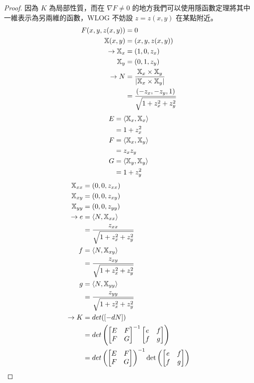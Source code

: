 \documentclass[10pt,a4paper]{article}
\begin{document}
\begin{proof}
因為 $K$ 為局部性質，而在 $\nabla F\neq 0$ 的地方我們可以使用隱函數定理將其中一維表示為另兩維的函數，WLOG 不妨設 $z=z(x,y)$ 在某點附近。
\begin{align*}
F(x,y,z(x,y))&=0\\
\mathbb{X}(x,y)&=(x,y,z(x,y))\\
\rightarrow \mathbb{X}_x&=(1,0,z_x)\\
\mathbb{X}_y&=(0,1,z_y)\\
\rightarrow N&=\frac{\mathbb{X}_x\times\mathbb{X}_y}{|\mathbb{X}_x\times\mathbb{X}_y|}\\
&=\frac{(-z_x,-z_y,1)}{\sqrt{1+z_x^2+z_y^2}}\\
\end{align*}
\begin{align*}
E&=\langle\mathbb{X}_x, \mathbb{X}_x\rangle\\
&=1+z_x^2\\
F&=\langle\mathbb{X}_x, \mathbb{X}_y\rangle\\
&=z_xz_y\\
G&=\langle\mathbb{X}_y, \mathbb{X}_y\rangle\\
&=1+z_y^2\\
\end{align*}
\begin{align*}
\bx_{xx}&=(0,0,z_{xx})\\
\bx_{xy}&=(0,0,z_{xy})\\
\bx_{yy}&=(0,0,z_{yy})\\
\rightarrow e&=\langle N, \bx_{xx}\rangle\\
&=\frac{z_{xx}}{\sqrt{1+z_x^2+z_y^2}}\\
f&=\langle N, \bx_{xy}\rangle\\
&=\frac{z_{xy}}{\sqrt{1+z_x^2+z_y^2}}\\
g&=\langle N, \bx_{yy}\rangle\\
&=\frac{z_{yy}}{\sqrt{1+z_x^2+z_y^2}}\\
\rightarrow K&=det([-dN])\\
&=det\left(\begin{bmatrix}E&F\\F&G\end{bmatrix}^{-1}\begin{bmatrix}e&f\\f&g\end{bmatrix}\right)\\
&=det\left(\begin{bmatrix}E&F\\F&G\end{bmatrix}\right)^{-1}\det\left(\begin{bmatrix}e&f\\f&g\end{bmatrix}\right)\\

\end{align*}
\end{proof}
\end{document}
